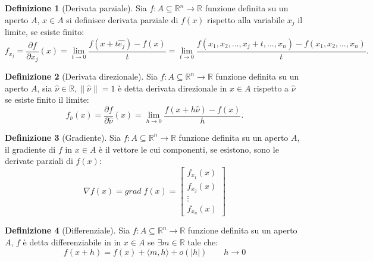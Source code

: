 \documentclass[leqno]{article}
\theoremstyle{definition}
\newtheorem{definition}{Definizione}[section]
\numberwithin{equation}{section}
\theoremstyle{remark}
\begin{document}
	\begin{definition}[Derivata parziale]
		Sia $f:A\subseteq \mathbb{R}^n \rightarrow \mathbb{R}$ funzione definita su un aperto $A$, $ {x} \in A$ si definisce derivata parziale di $f(x)$ rispetto alla variabile $x_j$ il limite, se esiste finito: 
		\begin{equation}
			f_{x_j}={\frac {\partial f}{\partial x_{j}}}(x)=\lim _{t\to 0}{\frac {f(  {x} +t  \hat{e_{j}})-f(  {x} )}{t}}=\lim _{t\to 0}{\frac {f(x_{1},x_{2},\dots, x_{j}+t,\dots ,x_{n})-f(x_{1},x_{2},\dots ,x_{n})}{t}}.
		\end{equation}
	\end{definition}
	\begin{definition}[Derivata direzionale]
		Sia $f:A\subseteq \mathbb{R}^n \rightarrow \mathbb{R}$ funzione definita su un aperto $A$, sia $\hat{\nu} \in \mathbb{R}, \lVert \hat{\nu} \rVert = 1$ è detta derivata direzionale in $ {x} \in A$ rispetto a $\hat{\nu}$ se esiste finito il limite:
		\begin{equation}
			f_{\hat{\nu}}(x)={\frac {\partial f}{\partial \hat{\nu}}(  {x} )=\lim _{h\rightarrow 0}{\frac {f( x +h  \hat{\nu} )-f( {x} )}{h}}.}
		\end{equation}
	\end{definition}
	\begin{definition}[Gradiente]
		Sia $f:A\subseteq \mathbb{R}^n \rightarrow \mathbb{R}$ funzione definita su un aperto $A$, il gradiente di $f$ in $ {x} \in A$ è il vettore le cui componenti, se esistono, sono le derivate parziali di $f(x)$:
		\begin{equation}
			\nabla f(x) = grad \; f(x) = \begin{bmatrix}
				f_{x_1}(x)\\ f_{x_2}(x)\\\vdots \\f_{x_n}(x)
			\end{bmatrix}
		\end{equation}
	\end{definition}
	\begin{definition}[Differenziale]
		Sia $f:A\subseteq \mathbb{R}^n \rightarrow \mathbb{R}$ funzione definita su un aperto $A$, $f$ è detta differenziabile in in $ {x} \in A$ se $\exists m \in \mathbb{R}$ tale che: 
		\begin{equation}
			f(x+h)=f(x)+\langle m , h \rangle + o(|h|) \quad \quad h\rightarrow 0
		\end{equation}
	\end{definition}
	
\end{document}
